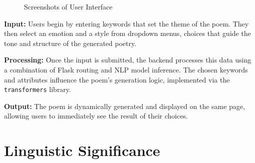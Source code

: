 \documentclass[11pt]{article}
\begin{document}
\begin{figure}[ht]
\centering
\hfill %
\caption{Screenshots of User Interface}
\end{figure}

\textbf{Input:} Users begin by entering keywords that set the theme of the poem. They then select an emotion and a style from dropdown menus, choices that guide the tone and structure of the generated poetry.

\textbf{Processing:} Once the input is submitted, the backend processes this data using a combination of Flask routing and NLP model inference. The chosen keywords and attributes influence the poem's generation logic, implemented via the \texttt{transformers} library.

\textbf{Output:} The poem is dynamically generated and displayed on the same page, allowing users to immediately see the result of their choices.



\section{Linguistic Significance}
\end{document}
